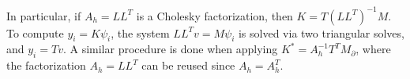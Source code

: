 In particular, if $A_h = LL^T$ is a Cholesky factorization, then $K = T (LL^T)^{-1}M$. To compute $y_i = K \psi_i$, the system $LL^T v = M \psi_i$ is solved via two triangular solves, and $y_i = T v$. A similar procedure is done when applying $K^* = A_h^{-1}T^TM_\partial$, where the factorization $A_h = LL^T$ can be reused since $A_h = A_h^T$.
